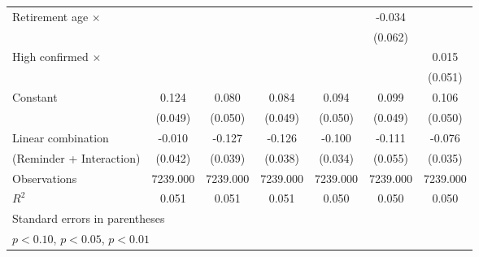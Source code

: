 {\begin{tabular}{l*{6}{c}}
\addlinespace
Retirement age $\times$&                     &                     &                     &                     &      -0.034         &                     \\
                    &                     &                     &                     &                     &     (0.062)         &                     \\
\addlinespace
High confirmed $\times$&                     &                     &                     &                     &                     &       0.015         \\
                    &                     &                     &                     &                     &                     &     (0.051)         \\
\addlinespace
Constant            &       0.124\sym{**} &       0.080         &       0.084\sym{*}  &       0.094\sym{*}  &       0.099\sym{**} &       0.106\sym{**} \\
                    &     (0.049)         &     (0.050)         &     (0.049)         &     (0.050)         &     (0.049)         &     (0.050)         \\
\midrule
Linear combination  &      -0.010         &      -0.127         &      -0.126         &      -0.100         &      -0.111         &      -0.076         \\
(Reminder + Interaction)&     (0.042)         &     (0.039)         &     (0.038)         &     (0.034)         &     (0.055)         &     (0.035)         \\
Observations        &    7239.000         &    7239.000         &    7239.000         &    7239.000         &    7239.000         &    7239.000         \\
\(R^{2}\)           &       0.051         &       0.051         &       0.051         &       0.050         &       0.050         &       0.050         \\
\bottomrule
\multicolumn{7}{l}{\footnotesize Standard errors in parentheses}\\
\multicolumn{7}{l}{\footnotesize \sym{*} \(p<0.10\), \sym{**} \(p<0.05\), \sym{***} \(p<0.01\)}\\
\end{tabular}
}
